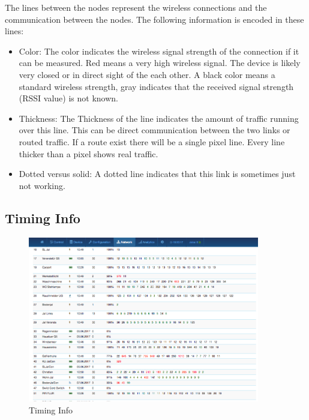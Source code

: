 {The lines between the nodes represent the wireless connections and the communication between
the nodes. The following information is encoded in these lines:

\begin{itemize}
\item Color: The color indicates the wireless signal strength of the connection if it can be
measured. Red means a very high wireless signal.
The device is likely very closed or in direct sight of the each other. A black color means a
standard wireless strength, gray indicates that the received signal strength (RSSI value) 
is not known.

\item Thickness: The Thickness of the line indicates the amount of traffic running over
this line. This can be direct communication between the two links or routed traffic. If a 
route exist there will be a single pixel line. Every line thicker than a pixel shows real 
traffic.

\item Dotted versus solid: A dotted line indicates that this link is sometimes just not working.
\end{itemize}


\subsection{Timing Info}

\begin{figure}
\begin{center}
\includegraphics[width=0.9\textwidth]{pngs/cap7/eui25.png}
\caption{Timing Info}
\label{eui25}
\end{center}
\end{figure}

}
